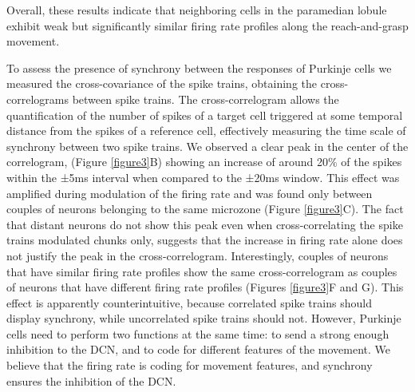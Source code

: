 Overall, these results indicate that neighboring cells in the paramedian lobule exhibit weak but significantly similar firing rate profiles along the reach-and-grasp movement.


To assess the presence of synchrony between the responses of Purkinje cells we measured the cross-covariance of the spike trains, obtaining the cross-correlograms between spike trains. The cross-correlogram allows the quantification of the number of spikes of a target cell triggered at some temporal distance from the spikes of a reference cell, effectively measuring the time scale of synchrony between two spike trains. We observed a clear peak in the center of the correlogram, (Figure \ref{figure3}B) showing an increase of around 20\% of the spikes within the ±5ms interval when compared to the ±20ms window. This effect was amplified during modulation of the firing rate and was found only between couples of neurons belonging to the same microzone (Figure \ref{figure3}C). The fact that distant neurons do not show this peak even when cross-correlating the spike trains modulated chunks only, suggests that the increase in firing rate alone does not justify the peak in the cross-correlogram. 
Interestingly, couples of neurons that have similar firing rate profiles show the same cross-correlogram as couples of neurons that have different firing rate profiles (Figures \ref{figure3}F and G). This effect is apparently counterintuitive, because correlated spike trains should display synchrony, while uncorrelated spike trains should not. However, Purkinje cells need to perform two functions at the same time: to send a strong enough inhibition to the DCN, and to code for different features of the movement. We believe that the firing rate is coding for movement features, and synchrony ensures the inhibition of the DCN.

